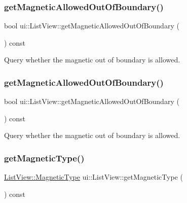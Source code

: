\subsubsection{\texorpdfstring{get\+Magnetic\+Allowed\+Out\+Of\+Boundary()}{getMagneticAllowedOutOfBoundary()}\hspace{0.1cm}{\footnotesize\ttfamily [1/2]}}
{\footnotesize\ttfamily bool ui\+::\+List\+View\+::get\+Magnetic\+Allowed\+Out\+Of\+Boundary (\begin{DoxyParamCaption}{ }\end{DoxyParamCaption}) const}

Query whether the magnetic out of boundary is allowed. \mbox{\label{classui_1_1ListView_acfed7db635b37551e6a1429b54dd8178}} 
\subsubsection{\texorpdfstring{get\+Magnetic\+Allowed\+Out\+Of\+Boundary()}{getMagneticAllowedOutOfBoundary()}\hspace{0.1cm}{\footnotesize\ttfamily [2/2]}}
{\footnotesize\ttfamily bool ui\+::\+List\+View\+::get\+Magnetic\+Allowed\+Out\+Of\+Boundary (\begin{DoxyParamCaption}{ }\end{DoxyParamCaption}) const}

Query whether the magnetic out of boundary is allowed. \mbox{\label{classui_1_1ListView_a78e5f1e9024b6d195035e07e4183976d}} 
\subsubsection{\texorpdfstring{get\+Magnetic\+Type()}{getMagneticType()}\hspace{0.1cm}{\footnotesize\ttfamily [1/2]}}
{\footnotesize\ttfamily \hyperlink{classui_1_1ListView_a143593e762b785241572552b060aed6f}{List\+View\+::\+Magnetic\+Type} ui\+::\+List\+View\+::get\+Magnetic\+Type (\begin{DoxyParamCaption}{ }\end{DoxyParamCaption}) const}

